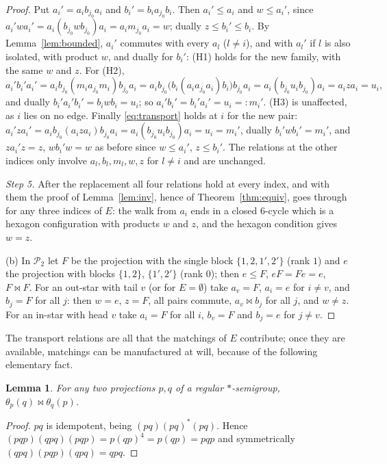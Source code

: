 \documentclass[11pt]{amsart}
\newtheorem{lemma}[theorem]{Lemma}
\theoremstyle{definition}
\renewcommand{\P}{\mathcal{P}}
\begin{document}
\begin{proof}
Put $a_i'=a_ib_{j_0}a_i$ and $b_i'=b_ia_{j_0}b_i$. Then $a_i'\le a_i$ and $w\le a_i'$, since $a_i'wa_i'=a_i(b_{j_0}wb_{j_0})a_i=a_im_{j_0}a_i=w$; dually $z\le b_i'\le b_i$. By Lemma~\ref{lem:bounded}, $a_i'$ commutes with every $a_l$ ($l\ne i$), and with $a_l'$ if $l$ is also isolated, with product $w$, and dually for $b_i'$: (H1) holds for the new family, with the same $w$ and $z$. For (H2),
\[
a_i'b_i'a_i'=a_ib_{j_0}(m_ia_{j_0}m_i)b_{j_0}a_i=a_ib_{j_0}\bigl(b_i(a_ia_{j_0}a_i)b_i\bigr)b_{j_0}a_i=a_i(b_{j_0}u_ib_{j_0})a_i=a_iza_i=u_i ,
\]
and dually $b_i'a_i'b_i'=b_iwb_i=u_i$; so $a_i'b_i'=b_i'a_i'=u_i=:m_i'$. (H3) is unaffected, as $i$ lies on no edge. Finally \eqref{eq:transport} holds at $i$ for the new pair: $a_i'za_i'=a_ib_{j_0}(a_iza_i)b_{j_0}a_i=a_i(b_{j_0}u_ib_{j_0})a_i=u_i=m_i'$, dually $b_i'wb_i'=m_i'$, and $za_i'z=z$, $wb_i'w=w$ as before since $w\le a_i'$, $z\le b_i'$. The relations at the other indices only involve $a_l,b_l,m_l,w,z$ for $l\ne i$ and are unchanged.

\emph{Step 5.} After the replacement all four relations hold at every index, and with them the proof of Lemma~\ref{lem:inv}, hence of Theorem~\ref{thm:equiv}, goes through for any three indices of $E$: the walk from $a_i$ ends in a closed $6$-cycle which is a hexagon configuration with products $w$ and $z$, and the hexagon condition gives $w=z$.

(b) In $\P_2$ let $F$ be the projection with the single block $\{1,2,1',2'\}$ (rank $1$) and $e$ the projection with blocks $\{1,2\}$, $\{1',2'\}$ (rank $0$); then $e\le F$, $eF=Fe=e$, $F\bowtie F$. For an out-star with tail $v$ (or for $E=\emptyset$) take $a_v=F$, $a_i=e$ for $i\ne v$, and $b_j=F$ for all $j$: then $w=e$, $z=F$, all pairs commute, $a_v\bowtie b_j$ for all $j$, and $w\ne z$. For an in-star with head $v$ take $a_i=F$ for all $i$, $b_v=F$ and $b_j=e$ for $j\ne v$.
\end{proof}

The transport relations are all that the matchings of $E$ contribute; once they are available, matchings can be manufactured at will, because of the following elementary fact.

\begin{lemma}\label{lem:friends}
For any two projections $p,q$ of a regular $*$-semigroup, $\theta_p(q)\bowtie\theta_q(p)$.
\end{lemma}
\begin{proof}
$pq$ is idempotent, being $(pq)(pq)^*(pq)$. Hence $(pqp)(qpq)(pqp)=p(qp)^4=p(qp)=pqp$ and symmetrically $(qpq)(pqp)(qpq)=qpq$.
\end{proof}
\end{document}
